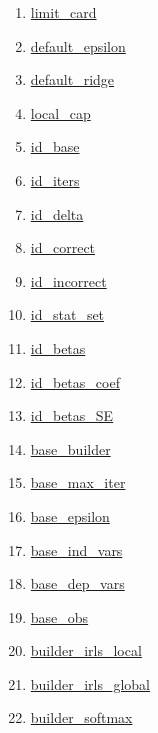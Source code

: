 \begin{enumerate}
\item \hyperlink{ecldoc:logisticregression.constants.limit_card}{limit\_card}
\item \hyperlink{ecldoc:logisticregression.constants.default_epsilon}{default\_epsilon}
\item \hyperlink{ecldoc:logisticregression.constants.default_ridge}{default\_ridge}
\item \hyperlink{ecldoc:logisticregression.constants.local_cap}{local\_cap}
\item \hyperlink{ecldoc:logisticregression.constants.id_base}{id\_base}
\item \hyperlink{ecldoc:logisticregression.constants.id_iters}{id\_iters}
\item \hyperlink{ecldoc:logisticregression.constants.id_delta}{id\_delta}
\item \hyperlink{ecldoc:logisticregression.constants.id_correct}{id\_correct}
\item \hyperlink{ecldoc:logisticregression.constants.id_incorrect}{id\_incorrect}
\item \hyperlink{ecldoc:logisticregression.constants.id_stat_set}{id\_stat\_set}
\item \hyperlink{ecldoc:logisticregression.constants.id_betas}{id\_betas}
\item \hyperlink{ecldoc:logisticregression.constants.id_betas_coef}{id\_betas\_coef}
\item \hyperlink{ecldoc:logisticregression.constants.id_betas_se}{id\_betas\_SE}
\item \hyperlink{ecldoc:logisticregression.constants.base_builder}{base\_builder}
\item \hyperlink{ecldoc:logisticregression.constants.base_max_iter}{base\_max\_iter}
\item \hyperlink{ecldoc:logisticregression.constants.base_epsilon}{base\_epsilon}
\item \hyperlink{ecldoc:logisticregression.constants.base_ind_vars}{base\_ind\_vars}
\item \hyperlink{ecldoc:logisticregression.constants.base_dep_vars}{base\_dep\_vars}
\item \hyperlink{ecldoc:logisticregression.constants.base_obs}{base\_obs}
\item \hyperlink{ecldoc:logisticregression.constants.builder_irls_local}{builder\_irls\_local}
\item \hyperlink{ecldoc:logisticregression.constants.builder_irls_global}{builder\_irls\_global}
\item \hyperlink{ecldoc:logisticregression.constants.builder_softmax}{builder\_softmax}
\end{enumerate}
